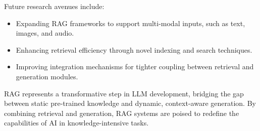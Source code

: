 \noindent Future research avenues include:

\begin{itemize}

	\item Expanding RAG frameworks to support multi-modal inputs, such as text, images, and audio.

	\item Enhancing retrieval efficiency through novel indexing and search techniques.

	\item Improving integration mechanisms for tighter coupling between retrieval and generation modules.

\end{itemize}

RAG represents a transformative step in LLM development, bridging the gap between static pre-trained knowledge and dynamic, context-aware generation.
By combining retrieval and generation, RAG systems are poised to redefine the capabilities of AI in knowledge-intensive tasks.